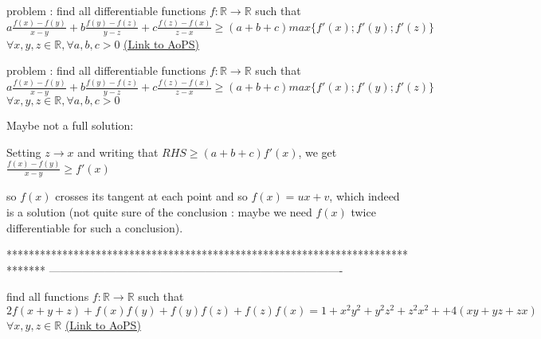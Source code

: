 \begin{problem}
	problem : find all differentiable functions $f:\mathbb{R}\to\mathbb{R}$ such that 
$a\frac{f(x)-f(y)}{x-y}+b\frac{f(y)-f(z)}{y-z}+c\frac{f(z)-f(x)}{z-x}\geq (a+b+c)max\{f'(x);f'(y);f'(z)\}$
$\forall x,y,z\in\mathbb{R},\forall a,b,c>0$
	\flushright \href{https://artofproblemsolving.com/community/c6h527788}{(Link to AoPS)}
\end{problem}



\begin{solution}
	\begin{tcolorbox}problem : find all differentiable functions $f:\mathbb{R}\to\mathbb{R}$ such that 
$a\frac{f(x)-f(y)}{x-y}+b\frac{f(y)-f(z)}{y-z}+c\frac{f(z)-f(x)}{z-x}\geq (a+b+c)max\{f'(x);f'(y);f'(z)\}$
$\forall x,y,z\in\mathbb{R},\forall a,b,c>0$\end{tcolorbox}
Maybe not a full solution:

Setting $z\to x$ and writing that $RHS\ge (a+b+c)f'(x)$, we get $\frac{f(x)-f(y)}{x-y}\ge f'(x)$

so $f(x)$ crosses its tangent at each point and so $\boxed{f(x)=ux+v}$, which indeed is a solution (not quite sure of the conclusion : maybe we need $f(x)$ twice differentiable for such a conclusion).
\end{solution}
*******************************************************************************
-------------------------------------------------------------------------------

\begin{problem}
	find all functions $f:\mathbb{R}\to\mathbb{R}$ such that 
$2f(x+y+z)+f(x)f(y)+f(y)f(z)+f(z)f(x)=1+x^2y^2+y^2z^2+z^2x^2+
                                                                       +4(xy+yz+zx)$
$\forall x,y,z\in\mathbb{R}$
	\flushright \href{https://artofproblemsolving.com/community/c6h527792}{(Link to AoPS)}
\end{problem}



